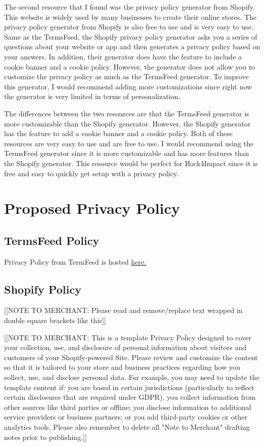 \documentclass[conference]{IEEEtran}
\begin{document}
The second resource that I found was the privacy policy generator from
Shopify. This website is widely used by many businesses to create
their online stores. The privacy policy generator from Shopify is
also free to use and is very easy to use. Same as the TermsFeed, 
the Shopify privacy policy generator asks you a series of questions
about your website or app and then generates a privacy policy based
on your answers. In addition, their generator does have the feature to include
a cookie banner and a cookie policy. However, the generator does not
allow you to customize the privacy policy as much as the TermsFeed
generator. To improve this generator, I would recommend adding more
customizations since right now the generator is very limited in terms of 
personalization.

The differences between the two resources are that the TermsFeed
generator is more customizable than the Shopify generator. However,
the Shopify generator has the feature to add a cookie banner and a
cookie policy. Both of these resources are very easy to use and are
free to use. I would recommend using the TermsFeed generator since it
is more customizable and has more features than the Shopify generator.
This resource would be perfect for Hack4Impact since it is free and easy to 
quickly get setup with a privacy policy.

\section{Proposed Privacy Policy}

\subsection{TermsFeed Policy}

Privacy Policy from TermFeed is hosted
\href{https://www.termsfeed.com/live/e677f83d-c9de-4679-b2b9-62429c67ea42}{here.}

\subsection{Shopify Policy}
[[NOTE TO MERCHANT: Please read and remove/replace text wrapped in double square brackets like this]]

[[NOTE TO MERCHANT: This is a template Privacy Policy designed to cover your collection, use, and disclosure of personal information about visitors and customers of your Shopify-powered Site. Please review and customize the content so that it is tailored to your store and business practices regarding how you collect, use, and disclose personal data. For example, you may need to update the template content if: you are based in certain jurisdictions (particularly to reflect certain disclosures that are required under GDPR), you collect information from other sources like third parties or offline; you disclose information to additional service providers or business partners; or you add third-party cookies or other analytics tools. Please also remember to delete all "Note to Merchant" drafting notes prior to publishing.]]
\end{document}
